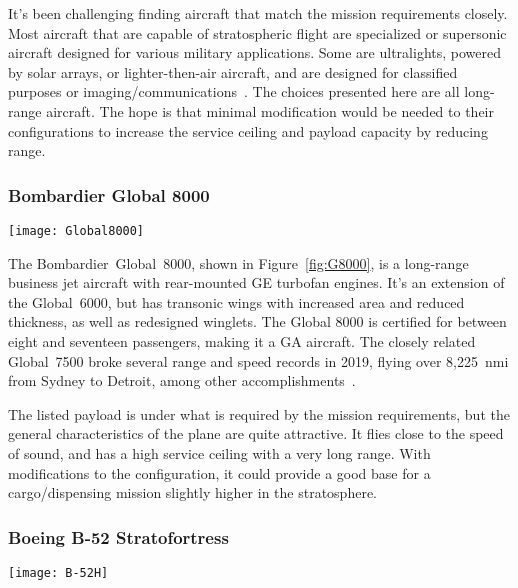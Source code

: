 \documentclass[12pt]{article}
\begin{document}
It's been challenging finding aircraft that match the mission requirements closely.
Most aircraft that are capable of stratospheric flight are specialized or supersonic aircraft designed for various military applications.
Some are ultralights, powered by solar arrays, or lighter-then-air aircraft, and are designed for classified purposes or imaging/communications~\cite{Piesing:2023aa}.
The choices presented here are all long-range aircraft.
The hope is that minimal modification would be needed to their configurations to increase the service ceiling and payload capacity by reducing range.


\subsubsection{Bombardier Global 8000}
\begin{SCfigure}[0.66][h]
	\centering
	\texttt{[image: Global8000]}
	\caption{A Bombardier Global 8000 Aircraft~\cite{pic:G8000}}
	\label{fig:G8000}
\end{SCfigure}

The Bombardier~Global~8000, shown in Figure~\ref{fig:G8000}, is a long-range business jet aircraft with rear-mounted GE turbofan engines.
It's an extension of the Global~6000, but has transonic wings with increased area and reduced thickness, as well as redesigned winglets.
The Global 8000 is certified for between eight and seventeen passengers, making it a GA aircraft.
The closely related Global~7500 broke several range and speed records in 2019, flying over 8,225~nmi from Sydney to Detroit, among other accomplishments~\cite{Janes:2023ab}.

The listed payload is under what is required by the mission requirements, but the general characteristics of the plane are quite attractive.
It flies close to the speed of sound, and has a high service ceiling with a very long range.
With modifications to the configuration, it could provide a good base for a cargo/dispensing mission slightly higher in the stratosphere.


\subsubsection{Boeing B-52 Stratofortress}
\begin{SCfigure}[0.7][h]
	\centering
	\texttt{[image: B-52H]}
	\caption{A Boeing B-52H Stratofortress in flight over the Persian Gulf~\cite{pic:B52H}}
	\label{fig:B52H}
\end{SCfigure}
\end{document}
